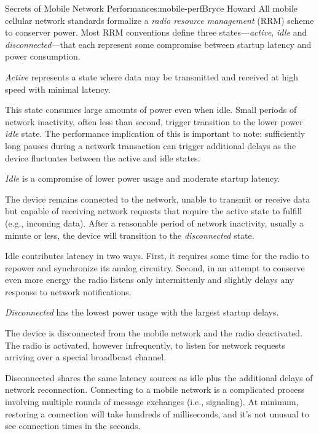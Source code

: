 \begin{aosachapter}{Secrets of Mobile Network Performance}{s:mobile-perf}{Bryce Howard}
All mobile cellular network standards formalize a \emph{radio resource
management} (RRM) scheme to conserver power. Most RRM conventions define
three states---\emph{active}, \emph{idle} and \emph{disconnected}---that
each represent some compromise between startup latency and power
consumption.



\emph{Active} represents a state where data may be transmitted and
received at high speed with minimal latency.

This state consumes large amounts of power even when idle. Small periods
of network inactivity, often less than second, trigger transition to the
lower power \emph{idle} state. The performance implication of this is
important to note: sufficiently long pauses during a network transaction
can trigger additional delays as the device fluctuates between the
active and idle states.


\emph{Idle} is a compromise of lower power usage and moderate startup
latency.

The device remains connected to the network, unable to transmit or
receive data but capable of receiving network requests that require the
active state to fulfill (e.g., incoming data). After a reasonable period
of network inactivity, usually a minute or less, the device will
transition to the \emph{disconnected} state.

Idle contributes latency in two ways. First, it requires some time for
the radio to repower and synchronize its analog circuitry. Second, in an
attempt to conserve even more energy the radio listens only
intermittenly and slightly delays any response to network notifications.


\emph{Disconnected} has the lowest power usage with the largest startup
delays.

The device is disconnected from the mobile network and the radio
deactivated. The radio is activated, however infrequently, to listen for
network requests arriving over a special broadbcast channel.

Disconnected shares the same latency sources as idle plus the additional
delays of network reconnection. Connecting to a mobile network is a
complicated process involving multiple rounds of message exchanges
(i.e., signaling). At minimum, restoring a connection will take hundreds
of milliseconds, and it's not unusual to see connection times in the
seconds.


\end{aosachapter}
